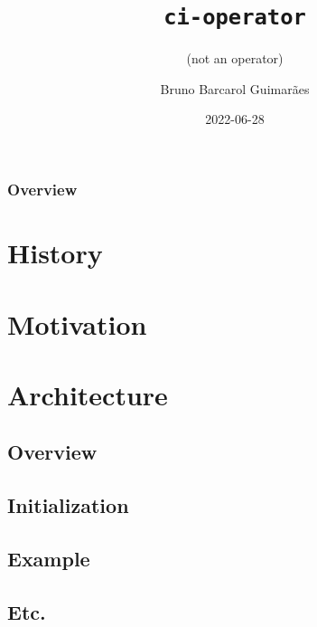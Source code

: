 \documentclass[10pt]{beamer}
\title{\texttt{ci-operator}}
\subtitle{(not an operator)}
\author{Bruno Barcarol Guimarães}
\institute[]{Red Hat}
\date{2022-06-28}
\begin{document}
\begin{frame}
    \titlepage
\end{frame}

\begin{frame}
    \frametitle{Overview}
    \tableofcontents
\end{frame}

\section{History}

\section{Motivation}

\section{Architecture}
\subsection{Overview}

\subsection{Initialization}

\subsection{Example}

\subsection{Etc.}


\begin{frame}
\end{frame}
\end{document}
